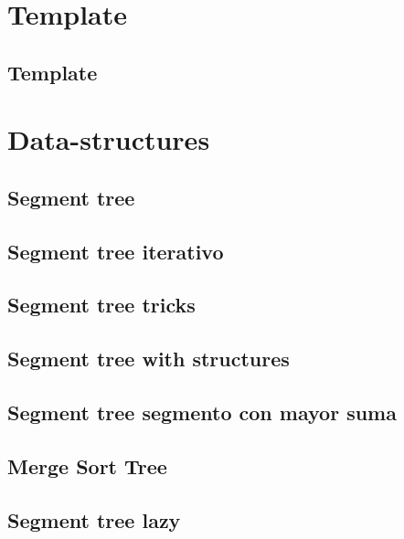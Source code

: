 \section{Template}
\subsection{Template}
\raggedbottom
\hrulefill

\section{Data-structures}
\subsection{Segment tree}
\raggedbottom
\hrulefill
\subsection{Segment tree iterativo}
\raggedbottom
\hrulefill
\subsection{Segment tree tricks}
\raggedbottom
\hrulefill
\subsection{Segment tree with structures}
\raggedbottom
\hrulefill
\subsection{Segment tree segmento con mayor suma}
\raggedbottom
\hrulefill
\subsection{Merge Sort Tree}
\raggedbottom
\hrulefill
\subsection{Segment tree lazy}
\raggedbottom
\hrulefill
